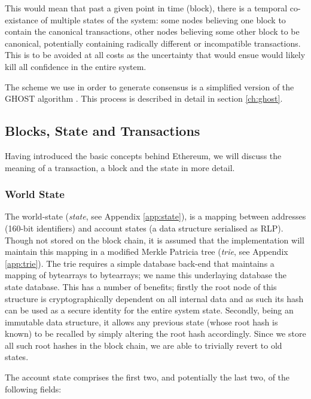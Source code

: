 \documentclass[9pt,oneside]{amsart}
\begin{document}
\begin{multicols}{2}
This would mean that past a given point in time (block), there is a temporal co-existance of multiple states of the system: some nodes believing one block to contain the canonical transactions, other nodes believing some other block to be canonical, potentially containing radically different or incompatible transactions. This is to be avoided at all costs as the uncertainty that would ensue would likely kill all confidence in the entire system.

The scheme we use in order to generate consensus is a simplified version of the GHOST algorithm \cite{ghost}. This process is described in detail in section \ref{ch:ghost}.

\subsection{Blocks, State and Transactions} \label{ch:bst}

Having introduced the basic concepts behind Ethereum, we will discuss the meaning of a transaction, a block and the state in more detail.

\subsubsection{World State} \label{ch:state}

The world-state (\textit{state}, see Appendix \ref{app:state}), is a mapping between addresses (160-bit identifiers) and account states (a data structure serialised as RLP). Though not stored on the block chain, it is assumed that the implementation will maintain this mapping in a modified Merkle Patricia tree (\textit{trie}, see Appendix \ref{app:trie}). The trie requires a simple database back-end that maintains a mapping of bytearrays to bytearrays; we name this underlaying database the state database. This has a number of benefits; firstly the root node of this structure is cryptographically dependent on all internal data and as such its hash can be used as a secure identity for the entire system state. Secondly, being an immutable data structure, it allows any previous state (whose root hash is known) to be recalled by simply altering the root hash accordingly. Since we store all such root hashes in the block chain, we are able to trivially revert to old states.

The account state comprises the first two, and potentially the last two, of the following fields:


\end{multicols}
\end{document}
